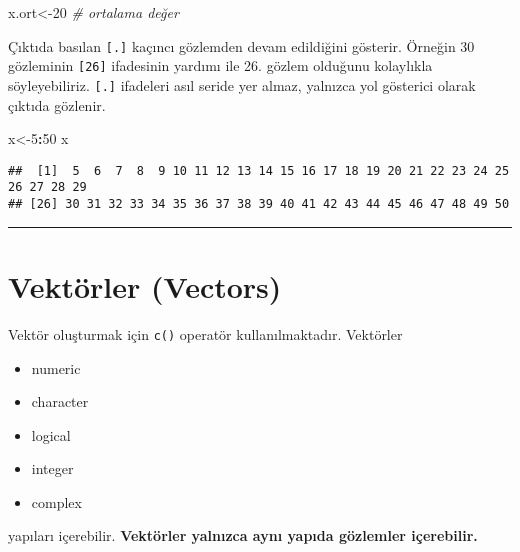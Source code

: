 \documentclass[
]{book}
\newenvironment{Shaded}{\begin{snugshade}}{\end{snugshade}}
\newcommand{\CommentTok}[1]{\textcolor[rgb]{0.56,0.35,0.01}{\textit{#1}}}
\newcommand{\DecValTok}[1]{\textcolor[rgb]{0.00,0.00,0.81}{#1}}
\newcommand{\NormalTok}[1]{#1}
\newcommand{\OperatorTok}[1]{\textcolor[rgb]{0.81,0.36,0.00}{\textbf{#1}}}
\providecommand{\tightlist}{%
  \setlength{\itemsep}{0pt}\setlength{\parskip}{0pt}}
\begin{document}
\begin{Shaded}
\begin{Highlighting}[]
\NormalTok{x.ort<-}\DecValTok{20}  \CommentTok{# ortalama değer}
\end{Highlighting}
\end{Shaded}

Çıktıda basılan \texttt{{[}.{]}} kaçıncı gözlemden devam edildiğini gösterir. Örneğin 30 gözleminin \texttt{{[}26{]}} ifadesinin yardımı ile 26. gözlem olduğunu kolaylıkla söyleyebiliriz. \texttt{{[}.{]}} ifadeleri asıl seride yer almaz, yalnızca yol gösterici olarak çıktıda gözlenir.

\begin{Shaded}
\begin{Highlighting}[]
\NormalTok{x<-}\DecValTok{5}\OperatorTok{:}\DecValTok{50}
\NormalTok{x}
\end{Highlighting}
\end{Shaded}

\begin{verbatim}
##  [1]  5  6  7  8  9 10 11 12 13 14 15 16 17 18 19 20 21 22 23 24 25 26 27 28 29
## [26] 30 31 32 33 34 35 36 37 38 39 40 41 42 43 44 45 46 47 48 49 50
\end{verbatim}

\begin{center}\rule{0.5\linewidth}{0.5pt}\end{center}

\hypertarget{vektuxf6rler-vectors}{%
\section{Vektörler (Vectors)}\label{vektuxf6rler-vectors}}

Vektör oluşturmak için \texttt{c()} operatör kullanılmaktadır. Vektörler

\begin{itemize}
\tightlist
\item
  numeric
\item
  character
\item
  logical
\item
  integer
\item
  complex
\end{itemize}

yapıları içerebilir. \textbf{Vektörler yalnızca aynı yapıda gözlemler içerebilir.}
\end{document}
